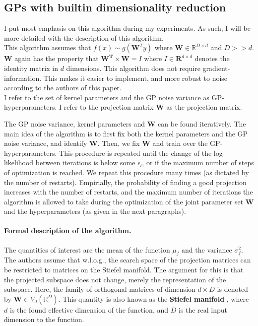 \subsection{GPs with builtin dimensionality reduction}
I put most emphasis on this algorithm during my experiments. 
As such, I will be more detailed with the description of this algorithm. \\

\citep{Tripathy} This algorithm assumes that  $f(x) \sim g( \mathbf{W}^T y)$ where $ \mathbf{W} \in \mathbb{R}^{D \times d} $ and $D >> d$.
$ \mathbf{W} $ again has the property that $\mathbf{W^T}  \times \mathbf{W} = I$ where $I \in \mathbf{R}^{d \times d}$ denotes the identity matrix in $d$ dimensions. 
This algorithm does not require gradient-information.
This makes it easier to implement, and more robust to noise according to the authors of this paper. \\


I refer to the set of kernel parameters and the GP noise variance as GP-hyperparameters.
I refer to the projection matrix $ \mathbf{W} $ as the projection matrix.

The GP noise variance, kernel parameters and  $ \mathbf{W} $ can be found iteratively.
The main idea of the algorithm is to first fix both the kernel parameters and the GP noise variance, and identify $ \mathbf{W} $.
Then, we fix $ \mathbf{W} $ and train over the GP-hyperparameters.
This procedure is repeated until the change of the log-likelihood between iterations is below some $ \epsilon_l $, or if the maximum number of steps of optimization is reached.
We repeat this procedure many times (as dictated by the number of restarts).
Empirially, the probability of finding a good projection increases with the number of restarts, and the maximum number of iterations the algorithm is allowed to take during the optimization of the joint parameter set $\mathbf{W}$ and the hyperparameters (as given in the next paragraphs).\\

\paragraph{Formal description of the algorithm.}
The quantities of interest are the mean of the function $\mu_f$ and the variance $\sigma^2_f$.
The authors assume that w.l.o.g., the search space of the projection matrices can be restricted to matrices on the Stiefel manifold.
The argument for this is that the projected subspace does not change, merely the representation of the subspace.
Here, the family of orthogonal matrices of dimension $d \times D$ is denoted by $\mathbf{W} \in V_d(\mathbb{R}^D) $.
This quantity is also known as the \textbf{Stiefel manifold} \citep{StiefelBayesianInference} \citep{StatisticsStiefelIntro} \citep{StiefelNonparametric}, where $d$ is the found effective dimension of the function, and $D$ is the real input dimension to the function. \\

